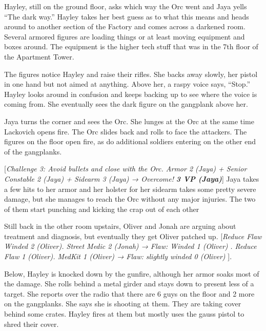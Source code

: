Hayley, still on the ground floor, asks which way the Orc went and Jaya yells ``The dark way.''  Hayley takes her best guess as to what this means and heads around to another section of the Factory and comes across a darkened room.  Several armored figures are loading things or at least moving equipment and boxes around.  The equipment is the higher tech stuff that was in the 7th floor of the Apartment Tower.



The figures notice Hayley and raise their rifles.  She backs away slowly, her pistol in one hand but not aimed at anything.  Above her, a raspy voice says, ``Stop.''  Hayley looks around in confusion and keeps backing up to see where the voice is coming from.  She eventually sees the dark figure on the gangplank above her.



Jaya turns the corner and sees the Orc.  She lunges at the Orc at the same time Lackovich opens fire.  The Orc slides back and rolls to face the attackers.  The figures on the floor open fire, as do additional soldiers entering on the other end of the gangplanks.



{[}\textit{Challenge 3: Avoid bullets and close with the Orc.  Armor 2 (Jaya) + Senior Constable 2 (Jaya) + Sidearm 3 (Jaya)  → Overcome! }\textit{\textbf{3 VP (Jaya)}}{]}  Jaya takes a few hits to her armor and her holster for her sidearm takes some pretty severe damage, but she manages to reach the Orc without any major injuries.   The two of them start punching and kicking the crap out of each other



Still back in the other room upstairs, Oliver and Jonah are arguing about treatment and diagnosis, but eventually they get Oliver patched up. {[}\textit{Reduce Flaw Winded 2 (Oliver).  Street Medic 2 (Jonah) → }\textit{Flaw: Winded 1 (Oliver)}\textit{ {\color[RGB]{255,0,0}. } }\textit{ }\textit{Reduce Flaw 1 (Oliver).  MedKit 1 (Oliver) → }\textit{ {\color[RGB]{255,0,0}Flaw: slightly winded 0 (Oliver)} }{]}.  



Below, Hayley is knocked down by the gunfire, although her armor soaks most of the damage.  She rolls behind a metal girder and stays down to present less of a target.  She reports over the radio that there are 6 guys on the floor and 2 more on the gangplanks.  She says she is shooting at them.  They are taking cover behind some crates.  Hayley fires at them but mostly uses the gauss pistol to shred their cover.



